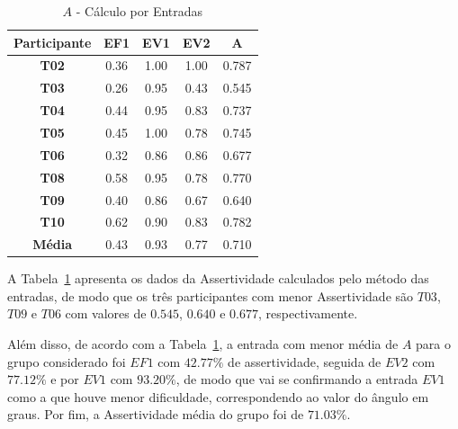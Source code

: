 \begin{table}[htbp]
	\centering
	\caption{$A$ - Cálculo por Entradas}
	\begin{tabular}{|c|c|c|c|c|}
		\hline
		\rowcolor[HTML]{D0CECE} 
		\textbf{Participante} & \textbf{EF1} & \textbf{EV1} & \textbf{EV2} & \textbf{A} \\ \hline
		\textbf{T02}          & 0.36         & 1.00         & 1.00         & 0.787      \\ \hline
		\rowcolor[HTML]{F2F2F2} 
		\textbf{T03}          & 0.26         & 0.95         & 0.43         & 0.545      \\ \hline
		\textbf{T04}          & 0.44         & 0.95         & 0.83         & 0.737      \\ \hline
		\rowcolor[HTML]{F2F2F2} 
		\textbf{T05}          & 0.45         & 1.00         & 0.78         & 0.745      \\ \hline
		\textbf{T06}          & 0.32         & 0.86         & 0.86         & 0.677      \\ \hline
		\rowcolor[HTML]{F2F2F2} 
		\textbf{T08}          & 0.58         & 0.95         & 0.78         & 0.770      \\ \hline
		\textbf{T09}          & 0.40         & 0.86         & 0.67         & 0.640      \\ \hline
		\rowcolor[HTML]{F2F2F2} 
		\textbf{T10}          & 0.62         & 0.90         & 0.83         & 0.782      \\ \hline
		\textbf{Média}        & 0.43         & 0.93         & 0.77         & 0.710      \\ \hline
	\end{tabular}	
	\label{tab:F3_A2_A_ENTRADAS}
\end{table}

A Tabela~\ref{tab:F3_A2_A_ENTRADAS} apresenta os dados da Assertividade calculados pelo método das entradas, de modo que os três participantes com menor Assertividade são $T03$, $T09$ e $T06$ com valores de $0.545$, $0.640$ e $0.677$, respectivamente.

Além disso, de acordo com a Tabela~\ref{tab:F3_A2_A_ENTRADAS}, a entrada com menor média de $A$ para o grupo considerado foi $EF1$ com $42.77\%$ de assertividade, seguida de $EV2$ com $77.12\%$ e por $EV1$ com $93.20\%$, de modo que vai se confirmando a entrada $EV1$ como a que houve menor dificuldade, correspondendo ao valor do ângulo em graus. Por fim, a Assertividade média do grupo foi de $71.03\%$.

